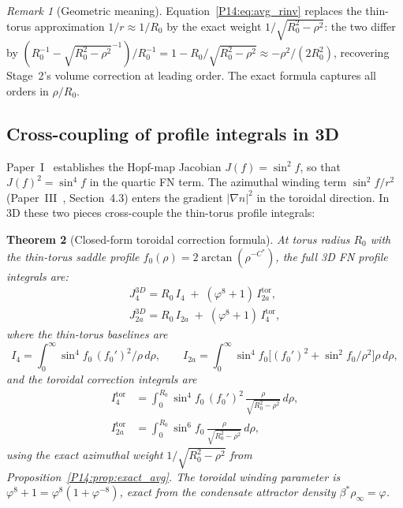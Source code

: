 \documentclass[11pt,a4paper]{article}
\newtheorem{theorem}{Theorem}[section]
\theoremstyle{definition}
\theoremstyle{remark}
\newtheorem{remark}[theorem]{Remark}
\newcommand{\vp}{\varphi}
\newcommand{\bst}{\beta^{*}}
\newcommand{\Jfour}{J_4}
\newcommand{\Ja}{J_{2a}}
\newcommand{\Cstar}{C^*}
\newcommand{\fzero}{f_0}
\newcommand{\Rzero}{R_0}
\newcommand{\Itor}[1]{I_{#1}^{\mathrm{tor}}}
\begin{document}
\begin{remark}[Geometric meaning]
\label{P14:rem:avg_rinv_meaning}
Equation~\eqref{P14:eq:avg_rinv} replaces the thin-torus approximation
$1/r\approx1/\Rzero$ by the exact weight $1/\sqrt{\Rzero^2-\rho^2}$:
the two differ by $(\Rzero^{-1}-\sqrt{\Rzero^2-\rho^2}^{-1})/\Rzero^{-1}
= 1-\Rzero/\sqrt{\Rzero^2-\rho^2}\approx-\rho^2/(2\Rzero^2)$,
recovering Stage~2's volume correction at leading order.
The exact formula captures all orders in $\rho/\Rzero$.
\end{remark}

\subsection{Cross-coupling of profile integrals in 3D}

Paper~I~\cite{Paper1} establishes the Hopf-map Jacobian
$J(f)=\sin^2\!f$,
so that $J(f)^2=\sin^4\!f$ in the quartic FN term.
The azimuthal winding term $\sin^2\!f/r^2$
(Paper~III~\cite{Paper5}, Section~4.3)
enters the gradient $|\nabla n|^2$ in the toroidal direction.
In 3D these two pieces cross-couple the thin-torus profile integrals:

\begin{theorem}[Closed-form toroidal correction formula]
\label{P14:thm:toroidal_formula}
At torus radius $\Rzero$ with the thin-torus saddle profile
$\fzero(\rho)=2\arctan(\rho^{-\Cstar})$, the full 3D FN profile
integrals are:
\begin{align}
  \boxed{\Jfour^{3D}
  = \Rzero\,I_4 \;+\; (\vp^8+1)\,\Itor{2a},}
  \label{P14:eq:J4_3D}\\
  \boxed{\Ja^{3D}
  = \Rzero\,I_{2a} \;+\; (\vp^8+1)\,\Itor{4},}
  \label{P14:eq:J2a_3D}
\end{align}
where the thin-torus baselines are
\begin{equation}
  I_4 = \int_0^\infty \sin^4\!\fzero\,(\fzero')^2/\rho\,d\rho,
  \qquad
  I_{2a} = \int_0^\infty \sin^4\!\fzero\bigl[(\fzero')^2+\sin^2\!\fzero/\rho^2\bigr]\rho\,d\rho,
\end{equation}
and the toroidal correction integrals are
\begin{align}
  \Itor{4}
  &= \int_0^{\Rzero} \sin^4\!\fzero\,(\fzero')^2\,
     \frac{\rho}{\sqrt{\Rzero^2-\rho^2}}\,d\rho,
  \label{P14:eq:I4tor}\\
  \Itor{2a}
  &= \int_0^{\Rzero} \sin^6\!\fzero\,
     \frac{\rho}{\sqrt{\Rzero^2-\rho^2}}\,d\rho,
  \label{P14:eq:I2ator}
\end{align}
using the exact azimuthal weight $1/\sqrt{\Rzero^2-\rho^2}$
from Proposition~\ref{P14:prop:exact_avg}.
The toroidal winding parameter is $\vp^8+1=\vp^8(1+\vp^{-8})$,
exact from the condensate attractor density $\bst\rho_\infty=\vp$.
\end{theorem}
\end{document}
